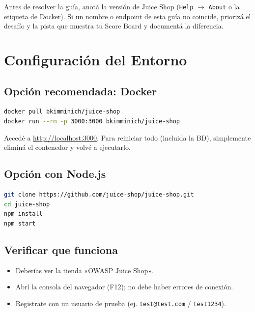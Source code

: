 \documentclass[11pt,a4paper]{article}
\begin{document}
\begin{pista}
Antes de resolver la guía, anotá la versión de Juice Shop (\texttt{Help} $\rightarrow$ \texttt{About} o la etiqueta de Docker). Si un nombre o endpoint de esta guía no coincide, priorizá el desafío y la pista que muestra tu Score Board y documentá la diferencia.
\end{pista}

\section{Configuración del Entorno}

\subsection{Opción recomendada: Docker}
\begin{lstlisting}[language=bash]
docker pull bkimminich/juice-shop
docker run --rm -p 3000:3000 bkimminich/juice-shop
\end{lstlisting}
Accedé a \url{http://localhost:3000}. Para reiniciar todo (incluida la BD), simplemente eliminá el contenedor y volvé a ejecutarlo.

\subsection{Opción con Node.js}
\begin{lstlisting}[language=bash]
git clone https://github.com/juice-shop/juice-shop.git
cd juice-shop
npm install
npm start
\end{lstlisting}

\subsection{Verificar que funciona}
\begin{itemize}[leftmargin=*]
  \item Deberías ver la tienda «OWASP Juice Shop».
  \item Abrí la consola del navegador (F12); no debe haber errores de conexión.
  \item Registrate con un usuario de prueba (ej. \texttt{test@test.com} / \texttt{test1234}).
\end{itemize}
\end{document}
